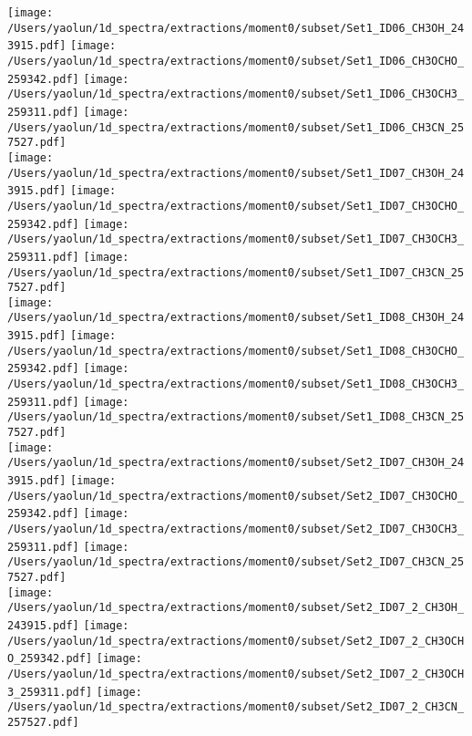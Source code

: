 \addtocounter{figure}{-1}
\begin{figure*}[htbp!]
  \centering
  \texttt{[image: /Users/yaolun/1d\_spectra/extractions/moment0/subset/Set1\_ID06\_CH3OH\_243915.pdf]}
  \texttt{[image: /Users/yaolun/1d\_spectra/extractions/moment0/subset/Set1\_ID06\_CH3OCHO\_259342.pdf]}
  \texttt{[image: /Users/yaolun/1d\_spectra/extractions/moment0/subset/Set1\_ID06\_CH3OCH3\_259311.pdf]}
  \texttt{[image: /Users/yaolun/1d\_spectra/extractions/moment0/subset/Set1\_ID06\_CH3CN\_257527.pdf]}
  \\
  \texttt{[image: /Users/yaolun/1d\_spectra/extractions/moment0/subset/Set1\_ID07\_CH3OH\_243915.pdf]}
  \texttt{[image: /Users/yaolun/1d\_spectra/extractions/moment0/subset/Set1\_ID07\_CH3OCHO\_259342.pdf]}
  \texttt{[image: /Users/yaolun/1d\_spectra/extractions/moment0/subset/Set1\_ID07\_CH3OCH3\_259311.pdf]}
  \texttt{[image: /Users/yaolun/1d\_spectra/extractions/moment0/subset/Set1\_ID07\_CH3CN\_257527.pdf]}
  \\
  \texttt{[image: /Users/yaolun/1d\_spectra/extractions/moment0/subset/Set1\_ID08\_CH3OH\_243915.pdf]}
  \texttt{[image: /Users/yaolun/1d\_spectra/extractions/moment0/subset/Set1\_ID08\_CH3OCHO\_259342.pdf]}
  \texttt{[image: /Users/yaolun/1d\_spectra/extractions/moment0/subset/Set1\_ID08\_CH3OCH3\_259311.pdf]}
  \texttt{[image: /Users/yaolun/1d\_spectra/extractions/moment0/subset/Set1\_ID08\_CH3CN\_257527.pdf]}
  \\
  \texttt{[image: /Users/yaolun/1d\_spectra/extractions/moment0/subset/Set2\_ID07\_CH3OH\_243915.pdf]}
  \texttt{[image: /Users/yaolun/1d\_spectra/extractions/moment0/subset/Set2\_ID07\_CH3OCHO\_259342.pdf]}
  \texttt{[image: /Users/yaolun/1d\_spectra/extractions/moment0/subset/Set2\_ID07\_CH3OCH3\_259311.pdf]}
  \texttt{[image: /Users/yaolun/1d\_spectra/extractions/moment0/subset/Set2\_ID07\_CH3CN\_257527.pdf]}
  \\
  \texttt{[image: /Users/yaolun/1d\_spectra/extractions/moment0/subset/Set2\_ID07\_2\_CH3OH\_243915.pdf]}
  \texttt{[image: /Users/yaolun/1d\_spectra/extractions/moment0/subset/Set2\_ID07\_2\_CH3OCHO\_259342.pdf]}
  \texttt{[image: /Users/yaolun/1d\_spectra/extractions/moment0/subset/Set2\_ID07\_2\_CH3OCH3\_259311.pdf]}
  \texttt{[image: /Users/yaolun/1d\_spectra/extractions/moment0/subset/Set2\_ID07\_2\_CH3CN\_257527.pdf]}
  \\
  \caption{}
\end{figure*}
